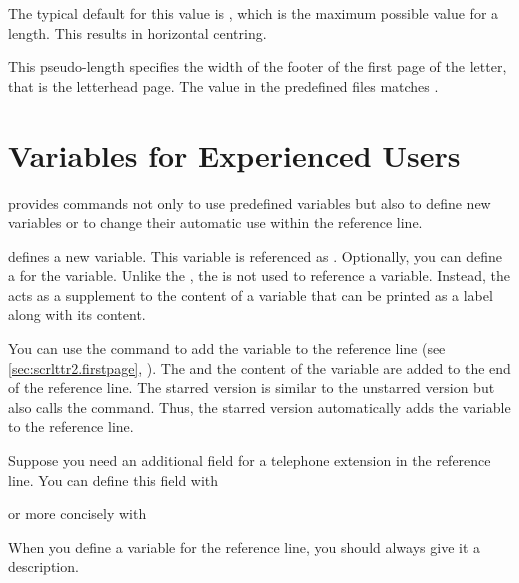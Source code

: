 The typical default for this value is ,
which is the maximum possible value for a length. This results in horizontal
centring.%
\EndIndexGroup


\begin{Declaration}
\end{Declaration}
This pseudo-length specifies the width of the footer of the first page of the
letter, that is the letterhead page. The value in the predefined 
files matches
%
.%
%
\EndIndexGroup
%
\EndIndexGroup
%
\EndIndexGroup


\section{Variables for Experienced Users}
\BeginIndexGroup
{}

\KOMAScript{} provides commands not only to use predefined variables but also
to define new variables or to change their automatic use within the reference
line.

\begin{Declaration}
\end{Declaration}
 defines a new variable. This variable is referenced as
. Optionally, you can define a  for the
 variable. Unlike the , the  is not
used to reference a variable. Instead, the  acts as a
supplement to the content of a variable that can be printed as a label along
with its content.

You can use the  command to add the 
variable to the reference line (see
\autoref{sec:scrlttr2.firstpage}, ). The
 and the content of the variable are added to the end of
the reference line. The starred version  is similar to the
unstarred version but also calls the  command. Thus, the
starred version automatically adds the variable to the reference line.
\begin{Example}
  Suppose you need an additional field for a telephone extension in the
  reference line. You can define this field with
\begin{lstcode}
\end{lstcode}
  or more concisely with
\begin{lstcode}
\end{lstcode}
\end{Example}
When you define a variable for the reference line, you
should always give it a description.

